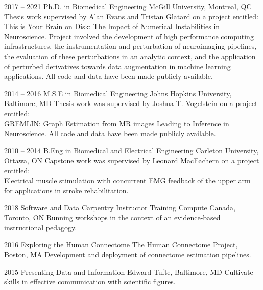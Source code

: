 \documentclass[]{friggeri-cv} %
\begin{document}
\begin{entrylist}


\entry
{2017 -- 2021}
{Ph.D. {\normalfont in Biomedical Engineering}}
{McGill University, Montreal, QC}
{Thesis work supervised by Alan Evans and Tristan Glatard on a project entitled:\\ This is Your Brain on Disk: The
Impact of Numerical Instabilities in Neuroscience. Project involved the development of high performance computing
infrastructures, the instrumentation and perturbation of neuroimaging pipelines, the evaluation of these perturbations
in an analytic context, and the application of perturbed derivatives towards data augmentation in machine learning
applications. All code and data have been made publicly available.}


\entry
{2014 -- 2016}
{M.S.E {\normalfont in Biomedical Engineering}}
{Johns Hopkins University, Baltimore, MD}
{Thesis work was supervised by Joshua T. Vogelstein on a project entitled:\\GREMLIN:
Graph Estimation from MR images Leading to Inference in Neuroscience. All code and data have
been made publicly available.}


\entry
{2010 -- 2014}
{B.Eng {\normalfont in Biomedical and Electrical Engineering}}
{Carleton University, Ottawa, ON}
{Capstone work was supervised by Leonard MacEachern on a project entitled:\\Electrical
muscle stimulation with concurrent EMG feedback of the upper arm for applications in stroke
rehabilitation.}


\entry
{2018}
{Software and Data Carpentry Instructor Training}
{Compute Canada, Toronto, ON}
{Running workshops in the context of an evidence-based instructional pedagogy.}


\entry
{2016}
{Exploring the Human Connectome}
{The Human Connectome Project, Boston, MA}
{Development and deployment of connectome estimation pipelines.}


\entry
{2015}
{Presenting Data and Information}
{Edward Tufte, Baltimore, MD}
{Cultivate skills in effective communication with scientific figures.}

\end{entrylist}
\end{document}
